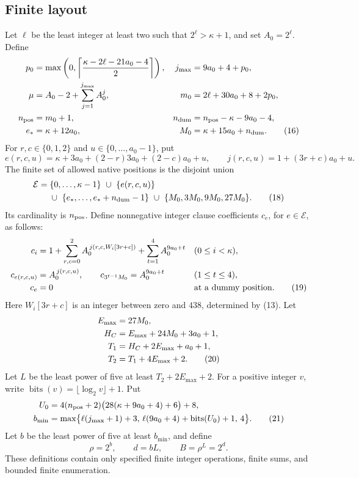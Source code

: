 \documentclass[11pt,a4paper]{article}
\theoremstyle{definition}
\theoremstyle{remark}
\begin{document}
\subsection{Finite layout}
Let \(\ell\) be the least integer at least two such that
\(2^\ell>\kappa+1\), and set \(A_0=2^\ell\).
Define
\begin{align}
 p_0&=\max\left(0,
     \left\lceil\frac{\kappa-2\ell-21a_0-4}{2}\right\rceil\right),&
 j_{\max}&=9a_0+4+p_0,\notag\\
 \mu&=A_0-2+\sum_{j=1}^{j_{\max}}A_0^j,&
 m_0&=2\ell+30a_0+8+2p_0,\notag\\
 n_{\rm pos}&=m_0+1,&
 n_{\rm dum}&=n_{\rm pos}-\kappa-9a_0-4,\notag\\
 e_*&=\kappa+12a_0,&
 M_0&=\kappa+15a_0+n_{\rm dum}. \tag{16}
\end{align}
For \(r,c\in\{0,1,2\}\) and \(u\in\{0,\ldots,a_0-1\}\), put
\[
 e(r,c,u)=\kappa+3a_0+(2-r)3a_0+(2-c)a_0+u,\qquad
 j(r,c,u)=1+(3r+c)a_0+u. \tag{17}
\]
The finite set of allowed native positions is the disjoint union
\begin{align}
 \mathcal E={}&
 \{0,\ldots,\kappa-1\}\ \cup\ \{e(r,c,u)\}\notag\\
 &\cup\ \{e_*,\ldots,e_*+n_{\rm dum}-1\}
 \ \cup\ \{M_0,3M_0,9M_0,27M_0\}. \tag{18}
\end{align}
Its cardinality is \(n_{\rm pos}\). Define nonnegative integer clause
coefficients \(c_e\), for \(e\in\mathcal E\), as follows:
\begin{align}
 c_i&=1+\sum_{r,c=0}^2 A_0^{\,j(r,c,W_i[3r+c])}
          +\sum_{t=1}^4 A_0^{9a_0+t}
             &&(0\le i<\kappa),\notag\\
 c_{e(r,c,u)}&=A_0^{\,j(r,c,u)},\qquad
 c_{3^{t-1}M_0}=A_0^{9a_0+t}
             &&(1\le t\le4),\notag\\
 c_e&=0 &&\text{at a dummy position}. \tag{19}
\end{align}
Here \(W_i[3r+c]\) is an integer between zero and \(438\), determined
by (13).
Let
\begin{align}
 E_{\max}&=27M_0,\notag\\
 H_C&=E_{\max}+24M_0+3a_0+1,\notag\\
 T_1&=H_C+2E_{\max}+a_0+1,\notag\\
 T_2&=T_1+4E_{\max}+2. \tag{20}\label{eq:bands}
\end{align}
Let \(L\) be the least power of five at least \(T_2+2E_{\max}+2\).
For a positive integer \(v\), write
\(\operatorname{bits}(v)=\lfloor\log_2v\rfloor+1\). Put
\begin{align}
 U_0&=4(n_{\rm pos}+2)\bigl(28(\kappa+9a_0+4)+6\bigr)+8,\notag\\
 b_{\min}&=\max\bigl\{\ell(j_{\max}+1)+3,\,
                \ell(9a_0+4)+\operatorname{bits}(U_0)+1,\,
                4\bigr\}. \tag{21}
\end{align}
Let \(b\) be the least power of five at least \(b_{\min}\), and define
\[
 \rho=2^b,\qquad d=bL,\qquad B=\rho^L=2^d. \tag{22}
\]
These definitions contain only specified finite integer operations,
finite sums, and bounded finite enumeration.
\end{document}
